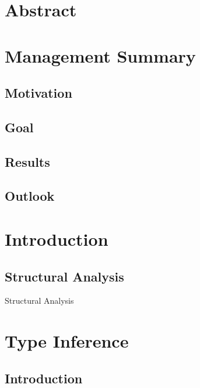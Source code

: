 \documentclass[12pt,halfparskip]{scrreprt}
\begin{document}
\chapter*{Abstract}


\chapter*{Management Summary}

\section*{Motivation}

\section*{Goal}

\section*{Results}

\section*{Outlook}


\newpage

\tableofcontents

\newpage
{}
\pagestyle{scrheadings}

\chapter{Introduction}

\section{Structural Analysis}

Structural Analysis

\chapter{Type Inference}

\section{Introduction}
\end{document}
